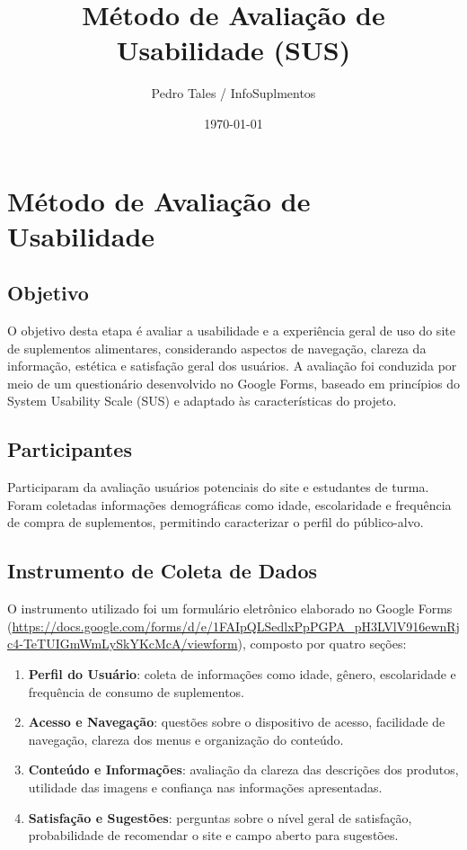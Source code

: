 \documentclass[12pt,a4paper]{article}
\title{Método de Avaliação de Usabilidade (SUS)}
\author{Pedro Tales / InfoSuplmentos}
\date{\today}
\begin{document}
\maketitle
\tableofcontents
\bigskip

\section{Método de Avaliação de Usabilidade}

\subsection{Objetivo}
O objetivo desta etapa é avaliar a usabilidade e a experiência geral de uso do site de suplementos alimentares, considerando aspectos de navegação, clareza da informação, estética e satisfação geral dos usuários. A avaliação foi conduzida por meio de um questionário desenvolvido no Google Forms, baseado em princípios do System Usability Scale (SUS) e adaptado às características do projeto.

\subsection{Participantes}
Participaram da avaliação usuários potenciais do site e estudantes de turma. Foram coletadas informações demográficas como idade, escolaridade e frequência de compra de suplementos, permitindo caracterizar o perfil do público-alvo.

\subsection{Instrumento de Coleta de Dados}
O instrumento utilizado foi um formulário eletrônico elaborado no Google Forms (\url{https://docs.google.com/forms/d/e/1FAIpQLSedlxPpPGPA_pH3LVlV916ewnRjc4-TeTUIGmWmLySkYKcMcA/viewform}), composto por quatro seções:

\begin{enumerate}
  \item \textbf{Perfil do Usuário}: coleta de informações como idade, gênero, escolaridade e frequência de consumo de suplementos.
  \item \textbf{Acesso e Navegação}: questões sobre o dispositivo de acesso, facilidade de navegação, clareza dos menus e organização do conteúdo.
  \item \textbf{Conteúdo e Informações}: avaliação da clareza das descrições dos produtos, utilidade das imagens e confiança nas informações apresentadas.
  \item \textbf{Satisfação e Sugestões}: perguntas sobre o nível geral de satisfação, probabilidade de recomendar o site e campo aberto para sugestões.
\end{enumerate}
\end{document}
